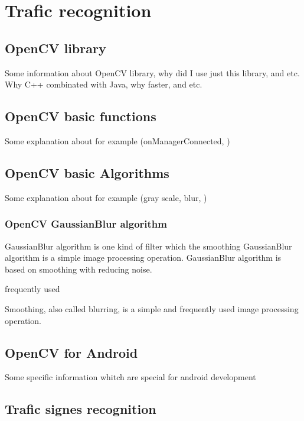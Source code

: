 \documentclass{article}
\begin{document}
\section{Trafic recognition}

\subsection{OpenCV library}

Some information about OpenCV library, why did I use just this library, and etc.
Why C++ combinated with Java, why faster, and etc.

\subsection{OpenCV basic functions}

Some explanation about for example (onManagerConnected, )

\subsection{OpenCV basic Algorithms}

Some explanation about for example (gray scale, blur, )

\subsubsection{OpenCV GaussianBlur algorithm}
GaussianBlur algorithm is one kind of filter which the smoothing
GaussianBlur algorithm is a simple image processing operation. 
GaussianBlur algorithm is based on smoothing with reducing noise.

 frequently used 

Smoothing, also called blurring, is a simple and frequently used image processing operation.


\subsection{OpenCV for Android}

Some specific information whitch are special for android development

\subsection{Trafic signes recognition}
\end{document}
